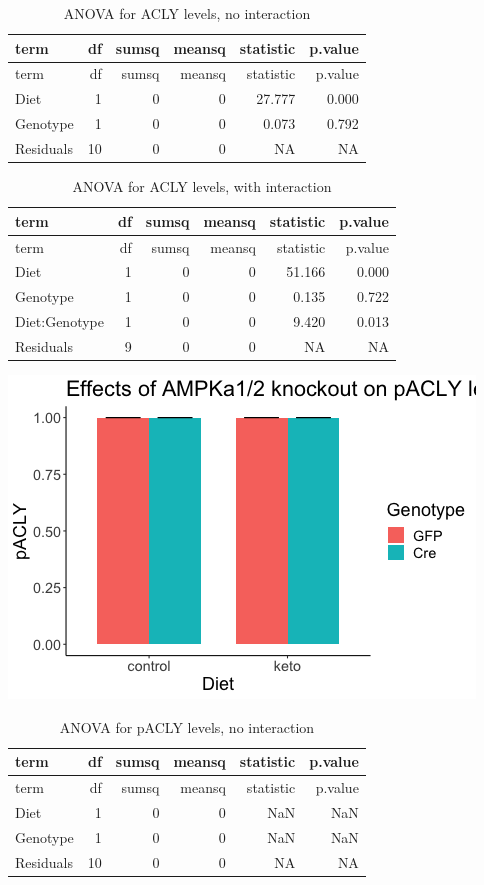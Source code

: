 \documentclass[
]{article}
\begin{document}
\begin{longtable}[]{@{}lrrrrr@{}}
\caption{ANOVA for ACLY levels, no interaction}\tabularnewline
\toprule
term & df & sumsq & meansq & statistic & p.value\tabularnewline
\midrule
\endfirsthead
\toprule
term & df & sumsq & meansq & statistic & p.value\tabularnewline
\midrule
\endhead
Diet & 1 & 0 & 0 & 27.777 & 0.000\tabularnewline
Genotype & 1 & 0 & 0 & 0.073 & 0.792\tabularnewline
Residuals & 10 & 0 & 0 & NA & NA\tabularnewline
\bottomrule
\end{longtable}

\begin{longtable}[]{@{}lrrrrr@{}}
\caption{ANOVA for ACLY levels, with interaction}\tabularnewline
\toprule
term & df & sumsq & meansq & statistic & p.value\tabularnewline
\midrule
\endfirsthead
\toprule
term & df & sumsq & meansq & statistic & p.value\tabularnewline
\midrule
\endhead
Diet & 1 & 0 & 0 & 51.166 & 0.000\tabularnewline
Genotype & 1 & 0 & 0 & 0.135 & 0.722\tabularnewline
Diet:Genotype & 1 & 0 & 0 & 9.420 & 0.013\tabularnewline
Residuals & 9 & 0 & 0 & NA & NA\tabularnewline
\bottomrule
\end{longtable}

\includegraphics{figures/pACLY-barplot-1.png}

\begin{longtable}[]{@{}lrrrrr@{}}
\caption{ANOVA for pACLY levels, no interaction}\tabularnewline
\toprule
term & df & sumsq & meansq & statistic & p.value\tabularnewline
\midrule
\endfirsthead
\toprule
term & df & sumsq & meansq & statistic & p.value\tabularnewline
\midrule
\endhead
Diet & 1 & 0 & 0 & NaN & NaN\tabularnewline
Genotype & 1 & 0 & 0 & NaN & NaN\tabularnewline
Residuals & 10 & 0 & 0 & NA & NA\tabularnewline
\bottomrule
\end{longtable}
\end{document}
